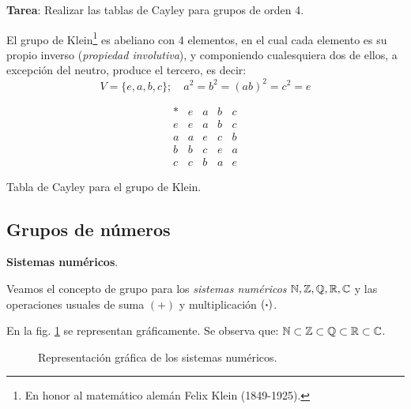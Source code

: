 \textbf{Tarea}: Realizar las tablas de Cayley para grupos de orden 4.

\begin{fmd-example}
	El grupo de Klein\footnote{En honor al matemático alemán Felix Klein (1849-1925).} es abeliano con 4 elementos, en el cual cada elemento es su propio inverso (\textit{propiedad involutiva}), y componiendo cualesquiera dos de ellos, a excepción del neutro, produce el tercero, es decir:
	\[ V = \{ e, a, b, c \}; \quad a^2 = b^2 = (ab)^2 = c^2 = e \]
	\vspace{-15mm}
	\begin{table}[H]
		\centering
		\[ \begin{array}{c|cccc}
			\ast & e & a & b & c \\ \hline
			e & e & a & b & c \\
			a & a & e & c & b \\
			b & b & c & e & a\\
			c & c & b & a & e
		\end{array}\]
		\caption{Tabla de Cayley para el grupo de Klein.}
		\label{tab:Klein}
	\end{table}
\end{fmd-example}

\subsection{Grupos de números}

\textbf{Sistemas numéricos}.

Veamos el concepto de grupo para los \textit{sistemas numéricos} $\mathbb{N}, \mathbb{Z}, \mathbb{Q}, \mathbb{R}, \mathbb{C}$ y las operaciones usuales de suma $(+)$ y multiplicación $(\boldsymbol{\cdot})$.

En la fig. \ref{fig:sisnum} se representan gráficamente. Se observa que: $\mathbb{N} \subset \mathbb{Z} \subset \mathbb{Q} \subset \mathbb{R} \subset \mathbb{C}$.

\begin{figure}[h]
	\centering
	
	\caption{Representación gráfica de los sistemas numéricos.}
	\label{fig:sisnum}
\end{figure}

